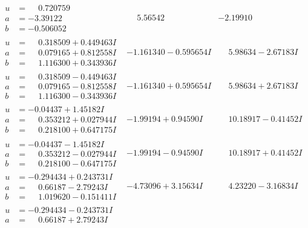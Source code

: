 \documentclass[1p]{elsarticle_modified}
\theoremstyle{definition}
\begin{document}
$$\begin{array}{c|c|c}
\begin{aligned}
u &= \phantom{-}0.720759\phantom{ +0.000000I} \\
a &= -3.39122\phantom{ +0.000000I} \\
b &= -0.506052\phantom{ +0.000000I}\end{aligned}
 & \phantom{-}5.56542\phantom{ +0.000000I} & -2.19910\phantom{ +0.000000I} \\ \hline\begin{aligned}
u &= \phantom{-}0.318509 + 0.449463 I \\
a &= \phantom{-}0.079165 + 0.812558 I \\
b &= \phantom{-}1.116300 + 0.343936 I\end{aligned}
 & -1.161340 - 0.595654 I & \phantom{-}5.98634 - 2.67183 I \\ \hline\begin{aligned}
u &= \phantom{-}0.318509 - 0.449463 I \\
a &= \phantom{-}0.079165 - 0.812558 I \\
b &= \phantom{-}1.116300 - 0.343936 I\end{aligned}
 & -1.161340 + 0.595654 I & \phantom{-}5.98634 + 2.67183 I \\ \hline\begin{aligned}
u &= -0.04437 + 1.45182 I \\
a &= \phantom{-}0.353212 + 0.027944 I \\
b &= \phantom{-}0.218100 + 0.647175 I\end{aligned}
 & -1.99194 + 0.94590 I & \phantom{-}10.18917 - 0.41452 I \\ \hline\begin{aligned}
u &= -0.04437 - 1.45182 I \\
a &= \phantom{-}0.353212 - 0.027944 I \\
b &= \phantom{-}0.218100 - 0.647175 I\end{aligned}
 & -1.99194 - 0.94590 I & \phantom{-}10.18917 + 0.41452 I \\ \hline\begin{aligned}
u &= -0.294434 + 0.243731 I \\
a &= \phantom{-}0.66187 - 2.79243 I \\
b &= \phantom{-}1.019620 - 0.151411 I\end{aligned}
 & -4.73096 + 3.15634 I & \phantom{-}4.23220 - 3.16834 I \\ \hline\begin{aligned}
u &= -0.294434 - 0.243731 I \\
a &= \phantom{-}0.66187 + 2.79243 I \\

\end{aligned}
\end{array}$$
\end{document}
